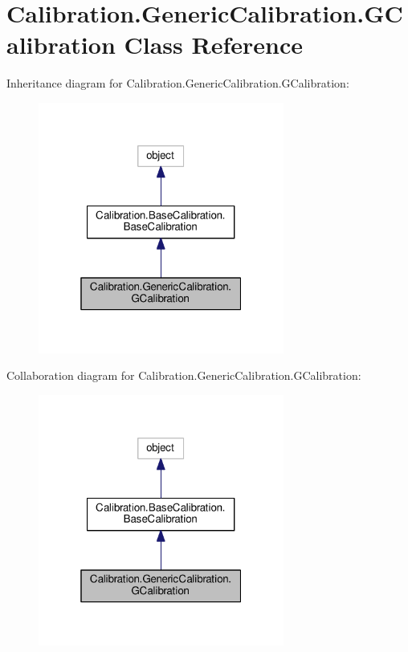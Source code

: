 \hypertarget{class_calibration_1_1_generic_calibration_1_1_g_calibration}{}\section{Calibration.\+Generic\+Calibration.\+G\+Calibration Class Reference}
\label{class_calibration_1_1_generic_calibration_1_1_g_calibration}


Inheritance diagram for Calibration.\+Generic\+Calibration.\+G\+Calibration\+:\nopagebreak
\begin{figure}[H]
\begin{center}
\leavevmode
\includegraphics[width=229pt]{class_calibration_1_1_generic_calibration_1_1_g_calibration__inherit__graph}
\end{center}
\end{figure}


Collaboration diagram for Calibration.\+Generic\+Calibration.\+G\+Calibration\+:\nopagebreak
\begin{figure}[H]
\begin{center}
\leavevmode
\includegraphics[width=229pt]{class_calibration_1_1_generic_calibration_1_1_g_calibration__coll__graph}
\end{center}
\end{figure}
